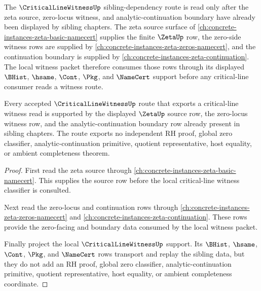 The $\CriticalLineWitnessUp$ sibling-dependency route is read only after the zeta source, zero-locus witness, and analytic-continuation boundary have already been displayed by sibling chapters. The zeta source surface of \autoref{ch:concrete-instances-zeta-basic-namecert} supplies the finite $\ZetaUp$ row, the zero-side witness rows are supplied by \autoref{ch:concrete-instances-zeta-zeros-namecert}, and the continuation boundary is supplied by \autoref{ch:concrete-instances-zeta-continuation}. The local witness packet therefore consumes those rows through its displayed $\BHist$, $\hsame$, $\Cont$, $\Pkg$, and $\NameCert$ support before any critical-line consumer reads a witness route.

\begin{lemma}
\label{lem:critical-line-witness-sibling-dependency-route}
Every accepted $\CriticalLineWitnessUp$ route that exports a critical-line witness read is supported by the displayed $\ZetaUp$ source row, the zero-locus witness row, and the analytic-continuation boundary row already present in sibling chapters. The route exports no independent RH proof, global zero classifier, analytic-continuation primitive, quotient representative, host equality, or ambient completeness theorem.
\end{lemma}
\begin{proof}
First read the zeta source through \autoref{ch:concrete-instances-zeta-basic-namecert}. This supplies the source row before the local critical-line witness classifier is consulted.

Next read the zero-locus and continuation rows through \autoref{ch:concrete-instances-zeta-zeros-namecert} and \autoref{ch:concrete-instances-zeta-continuation}. These rows provide the zero-facing and boundary data consumed by the local witness packet.

Finally project the local $\CriticalLineWitnessUp$ support. Its $\BHist$, $\hsame$, $\Cont$, $\Pkg$, and $\NameCert$ rows transport and replay the sibling data, but they do not add an RH proof, global zero classifier, analytic-continuation primitive, quotient representative, host equality, or ambient completeness coordinate.
\end{proof}
